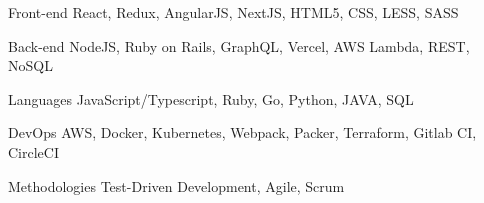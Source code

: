 

\begin{cvskills}
  
  \cvskill
    {Front-end} %
    {React, Redux, AngularJS, NextJS, HTML5, CSS, LESS, SASS} %

  \cvskill
    {Back-end} %
    {NodeJS, Ruby on Rails, GraphQL, Vercel, AWS Lambda, REST, NoSQL} %

  \cvskill
    {Languages} %
    {JavaScript/Typescript, Ruby, Go, Python, JAVA, SQL} %

  \cvskill
    {DevOps} %
    {AWS, Docker, Kubernetes, Webpack, Packer, Terraform, Gitlab CI, CircleCI} %

  \cvskill
    {Methodologies} %
    {Test-Driven Development, Agile, Scrum} %

\end{cvskills}
